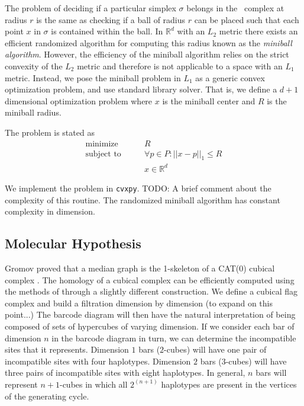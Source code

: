 The problem of deciding if a particular simplex $\sigma$ belongs in the \Cech\ complex at radius $r$ is the same as checking if a ball of radius $r$ can be placed such that each point $x$ in $\sigma$ is contained within the ball.
In $\mathbb{R}^d$ with an $L_2$ metric there exists an efficient randomized algorithm for computing this radius known as the \emph{miniball algorithm}.\autocite{Gartner:1999}
However, the efficiency of the miniball algorithm relies on the strict convexity of the $L_2$ metric and therefore is not applicable to a space with an $L_1$ metric.
Instead, we pose the miniball problem in $L_1$ as a generic convex optimization problem, and use standard library solver.
That is, we define a $d+1$ dimensional optimization problem where $x$ is the miniball center and $R$ is the miniball radius.

The problem is stated as
\begin{align*}
\text{minimize}\qquad   &  R \\
\text{subject to}\qquad & \forall p \in P: ||x-p||_{1} \leq R \\
                        & x \in \mathbb{R}^d
\end{align*}

We implement the problem in \texttt{cvxpy}.
TODO: A brief comment about the complexity of this routine.
The randomized miniball algorithm has constant complexity in dimension.

\subsection{Molecular Hypothesis}

Gromov proved that a median graph is the 1-skeleton of a CAT(0) cubical complex \citep{Gromov:1987}.
The homology of a cubical complex can be efficiently computed using the methods of \citet{Kaczynski:2004} through a slightly different construction.
We define a cubical flag complex and build a filtration dimension by dimension (to expand on this point...)
The barcode diagram will then have the natural interpretation of being composed of sets of hypercubes of varying dimension.
If we consider each bar of dimension $n$ in the barcode diagram in turn, we can determine the incompatible sites that it represents.
Dimension $1$ bars ($2$-cubes) will have one pair of incompatible sites with four haplotypes.
Dimension $2$ bars ($3$-cubes) will have three pairs of incompatible sites with eight haplotypes.
In general, $n$ bars will represent $n+1$-cubes in which all $2^{(n+1)}$ haplotypes are present in the vertices of the generating cycle.

